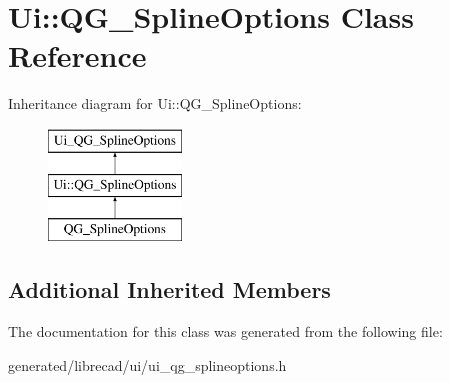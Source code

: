 \hypertarget{classUi_1_1QG__SplineOptions}{\section{Ui\-:\-:Q\-G\-\_\-\-Spline\-Options Class Reference}
\label{classUi_1_1QG__SplineOptions}
}
Inheritance diagram for Ui\-:\-:Q\-G\-\_\-\-Spline\-Options\-:\begin{figure}[H]
\begin{center}
\leavevmode
\includegraphics[height=3.000000cm]{classUi_1_1QG__SplineOptions}
\end{center}
\end{figure}
\subsection*{Additional Inherited Members}


The documentation for this class was generated from the following file\-:\begin{DoxyCompactItemize}
\item 
generated/librecad/ui/ui\-\_\-qg\-\_\-splineoptions.\-h\end{DoxyCompactItemize}

